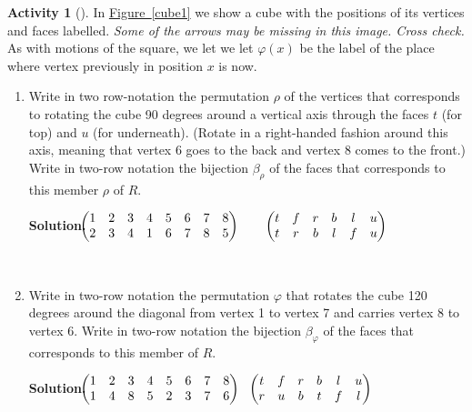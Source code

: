 \documentclass[10pt,]{book}
\theoremstyle{plain}
\theoremstyle{definition}
\newtheorem{activity}[project]{Activity}
\numberwithin{equation}{chapter}
\newcommand{\amp}{&}
\begin{document}
\begin{activity}[]\label{activity-277}
In \hyperref[cube1]{Figure~\ref{cube1}} we show a cube with the positions of its vertices and faces labelled. \emph{Some of the arrows may be missing in this image. Cross check.} As with motions of the square, we let we let \(\varphi(x)\) be the label of the place where vertex previously in position \(x\) is now.%
~\par
\begin{enumerate}[label=(\alph*)]
 \item Write in two row-notation the permutation \(\rho\) of the vertices that corresponds to rotating the cube 90 degrees around a vertical axis through the faces \(t\) (for top) and \(u\) (for underneath).  (Rotate in a right-handed fashion around this axis, meaning that vertex 6 goes to the back and vertex 8 comes to the front.)  Write in two-row notation the bijection \(\beta_{\rho}\) of the faces that corresponds to this member \(\rho\) of \(R\).%
\par\medskip\noindent%
\textbf{Solution.}\quad \(\!\!\!\begin{pmatrix}1\amp 2\amp 3\amp 4\amp 5\amp 6\amp 7\amp 8\cr
2\amp 3\amp 4\amp 1\amp 6\amp 7\amp 8\amp 5
\end{pmatrix}\)~~~~\(\begin{pmatrix}t\amp f\amp r\amp b\amp l\amp u\cr t\amp r\amp b\amp l\amp f\amp u
\end{pmatrix}\)%

~\par
\item Write in two-row notation the permutation \(\varphi\) that rotates the cube 120 degrees around the diagonal from vertex 1 to vertex 7 and carries vertex 8 to vertex 6.  Write in two-row notation the bijection \(\beta_\varphi\) of the faces that corresponds to this member of \(R\).%
\par\medskip\noindent%
\textbf{Solution.}\quad \(\!\!\!\begin{pmatrix}1\amp 2\amp 3\amp 4\amp 5\amp 6\amp 7\amp 8\cr1\amp 4\amp 8\amp 5\amp 2\amp 3\amp 7\amp 6
\end{pmatrix} ~
~\begin{pmatrix}t\amp f\amp r\amp b\amp l\amp u\cr r\amp u\amp b\amp t\amp f\amp l
\end{pmatrix}\)%


\end{enumerate}
\end{activity}
\end{document}

